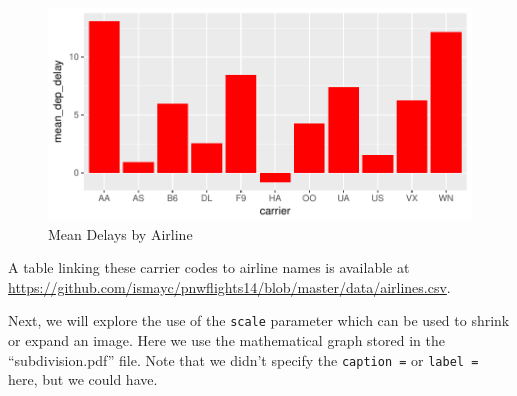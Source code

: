 \documentclass[12pt,twoside]{reedthesis}
\begin{document}
  \begin{Shaded}
  \begin{Highlighting}[]
  \NormalTok{(} \NormalTok{, }
         \NormalTok{, }
         \NormalTok{, } \NormalTok{)}
  \end{Highlighting}
  \end{Shaded}
  
  \begin{figure}[h!tbp]
  \centering
  \includegraphics[angle = 0,scale = 1]{figure/delays.pdf}
  \caption[Mean Delays by Airline]{\normalsize{Mean Delays by Airline}}
  \label{fig:delays}
  \end{figure}
  
  A table linking these carrier codes to airline names is available at
  \url{https://github.com/ismayc/pnwflights14/blob/master/data/airlines.csv}.
  
  \clearpage
  
  Next, we will explore the use of the \texttt{scale} parameter which can
  be used to shrink or expand an image. Here we use the mathematical graph
  stored in the ``subdivision.pdf'' file. Note that we didn't specify the
  \texttt{caption\ =} or \texttt{label\ =} here, but we could have.
  
  \begin{Shaded}
  \begin{Highlighting}[]
  \NormalTok{(}\NormalTok{, }\NormalTok{, }\NormalTok{, }
         \NormalTok{)}
  \end{Highlighting}
  \end{Shaded}
  
\end{document}
